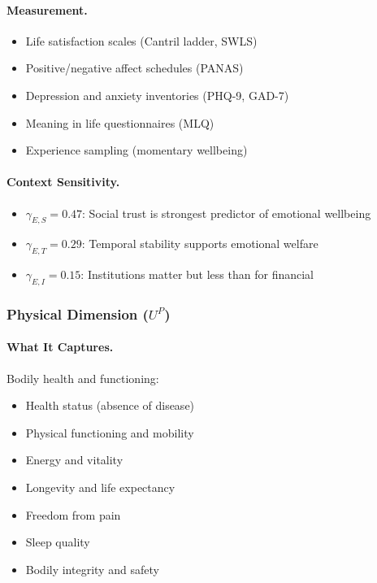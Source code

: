 \paragraph{Measurement.}
\begin{itemize}
\item Life satisfaction scales (Cantril ladder, SWLS)
\item Positive/negative affect schedules (PANAS)
\item Depression and anxiety inventories (PHQ-9, GAD-7)
\item Meaning in life questionnaires (MLQ)
\item Experience sampling (momentary wellbeing)
\end{itemize}

\paragraph{Context Sensitivity.}
\begin{itemize}
\item $\gamma_{E,S} = 0.47$: Social trust is strongest predictor of emotional wellbeing
\item $\gamma_{E,T} = 0.29$: Temporal stability supports emotional welfare
\item $\gamma_{E,I} = 0.15$: Institutions matter but less than for financial
\end{itemize}

\subsubsection{Physical Dimension ($U^P$)}

\paragraph{What It Captures.}
Bodily health and functioning:
\begin{itemize}
\item Health status (absence of disease)
\item Physical functioning and mobility
\item Energy and vitality
\item Longevity and life expectancy
\item Freedom from pain
\item Sleep quality
\item Bodily integrity and safety
\end{itemize}

